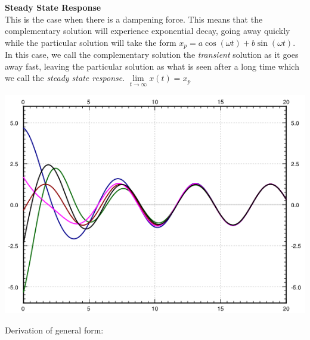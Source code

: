 \textbf{Steady State Response}\\
This is the case when there is a dampening force. This means that the complementary solution will experience exponential decay, going away quickly while the particular solution will take the form $x_p=a\cos(\omega t)+b\sin(\omega t)$. In this case, we call the complementary solution the \textit{transient} solution as it goes away fast, leaving the particular solution as what is seen after a long time which we call the \textit{steady state response}. $\lim\limits_{t\to\infty}x(t)=x_p$\\
\centerline{\includegraphics[scale=0.8]{Images/ODEPictures/steadyStateResponse.png}}
Derivation of general form:
